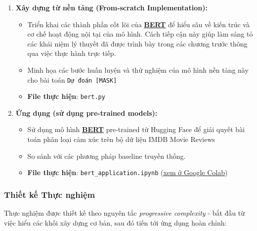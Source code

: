 \begin{enumerate}
    \item \textbf{Xây dựng từ nền tảng (From-scratch Implementation):} 
    \begin{itemize}
        \item Triển khai các thành phần cốt lõi của \hyperref[acro:bert]{\textbf{BERT}} để hiểu sâu về kiến trúc và cơ chế hoạt động nội tại của mô hình. Cách tiếp cận này giúp làm sáng tỏ các khái niệm lý thuyết đã được trình bày trong các chương trước thông qua việc thực hành trực tiếp. 
        \item Minh họa các bước huấn luyện và thử nghiệm của mô hình nền tảng này cho bài toán \texttt{Dự đoán [MASK]}
        \item \textbf{File thực hiện}: \texttt{bert.py}
    \end{itemize}
    \item \textbf{Ứng dụng (sử dụng pre-trained models):} 
    \begin{itemize}
        \item Sử dụng mô hình \hyperref[acro:bert]{\textbf{BERT}} pre-trained từ Hugging Face để giải quyết bài toán phân loại cảm xúc trên bộ dữ liệu IMDB Movie Reviews \cite{maas2011learning} 
        \item So sánh với các phương pháp baseline truyền thống.
        \item \textbf{File thực hiện}: \texttt{bert\_application.ipynb} (\href{https://colab.research.google.com/drive/1zA9fgGWFlxBlxHhLZLgE2NNVN0NPiT8y?usp=sharing}{xem ở Google Colab})
    \end{itemize}
\end{enumerate}

\subsubsection{Thiết kế Thực nghiệm}
Thực nghiệm được thiết kế theo nguyên tắc \textit{progressive complexity} - bắt đầu từ việc hiểu các khối xây dựng cơ bản, sau đó tiến tới ứng dụng hoàn chỉnh:

